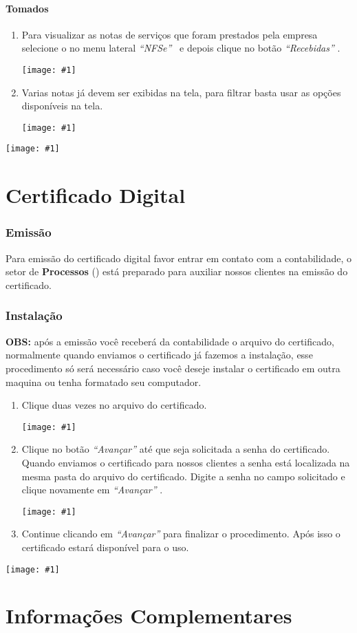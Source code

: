 \documentclass{article}
\newcommand{\itasp}[1]{
  \textit{``#1''}
}
\newcommand{\imagem}[2]{
  \begin{center}
    \texttt{[image: \#1]}
  \end{center}
}
\newcommand{\parte}[1]{
  \pagebreak
  \partfont{\centering}
  \imagem{logo}{0.4}
  \vspace*{\fill}
    \part{#1}
  \vspace*{\fill}
  \pagebreak
}
\begin{document}
  \subsection{Tomados}
  \begin{enumerate}
    \item Para visualizar as notas de serviços que foram prestados pela empresa selecione o no menu lateral \itasp{NFSe} \ e depois clique no botão \itasp{Recebidas}. \imagem{menu-nfe.PNG}{.2}
    \item Varias notas já devem ser exibidas na tela, para filtrar basta usar as opções disponíveis na tela. \imagem{filtro-nfse-rec.PNG}{.9}
  \end{enumerate}

\parte{Certificado Digital}
\section{Emissão}
\label{sec:emit-cert}
Para emissão do certificado digital favor entrar em contato com a contabilidade, o setor de \textbf{Processos} (\emailprocessos) está preparado para auxiliar nossos clientes na emissão do certificado.
\section{Instalação}
\label{sec:install-cert}
\textbf{OBS:} após a emissão você receberá da contabilidade o arquivo do certificado, normalmente quando enviamos o certificado já fazemos a instalação, esse procedimento só será necessário caso você deseje instalar o certificado em outra maquina ou tenha formatado seu computador.
\begin{enumerate}
  \item Clique duas vezes no arquivo do certificado. \imagem{cert-img}{1}
  \item Clique no botão \itasp{Avançar} até que seja solicitada a senha do certificado. Quando enviamos o certificado para nossos clientes a senha está localizada na mesma pasta do arquivo do certificado. Digite a senha no campo solicitado e clique novamente em \itasp{Avançar}. \imagem{senha-cert}{0.5}
  \item Continue clicando em \itasp{Avançar} para finalizar o procedimento. Após isso o certificado estará disponível para o uso.
\end{enumerate}

\parte{Informações Complementares}
\end{document}
